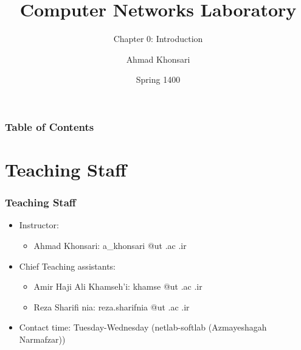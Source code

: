 \documentclass[aspectratio=169,15pt]{beamer}
\title{Computer Networks Laboratory}
\subtitle{Chapter 0: Introduction}
\author{Ahmad Khonsari}
\institute[ECE @ UT]{
    Electrical and Computer Engineering Department\\
    Tehran University \newline
    \url{http://ece.ut.ac.ir/}
}
\date{Spring 1400}
\begin{document}
\frame{\titlepage}


\begin{frame}
    \frametitle{Table of Contents}
    \tableofcontents
\end{frame}

\section{Teaching Staff}
\begin{frame}
\frametitle{Teaching Staff}
\begin{itemize}
    \item Instructor:
    \begin{itemize}
        \item Ahmad Khonsari: \alert{a\_khonsari @ut .ac .ir}
    \end{itemize}
    \item Chief Teaching assistants:
    \begin{itemize}
        \item Amir Haji Ali Khamseh’i: \alert{khamse @ut .ac .ir}
        \item Reza Sharifi nia: \alert{reza.sharifnia @ut .ac .ir}
    \end{itemize}
    \item Contact time: Tuesday-Wednesday (netlab-softlab (Azmayeshagah Narmafzar))
\end{itemize}

\end{frame}
\end{document}
